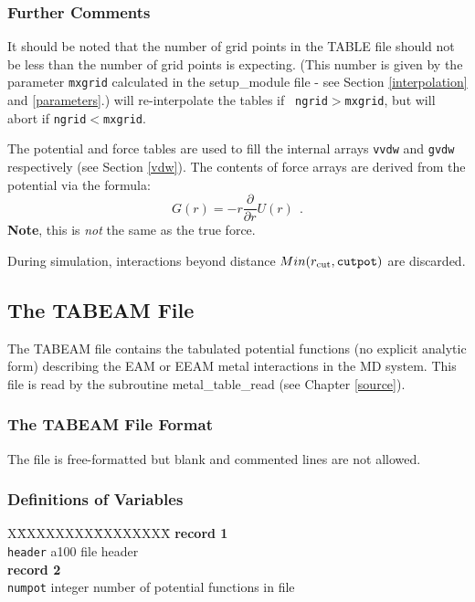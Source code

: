 \subsubsection{Further Comments}

It should be noted that the number of grid points in the TABLE file
should not be less than the number of grid points \D is expecting.
(This number is given by the parameter {\tt mxgrid} calculated in
the {\sc setup\_module} file - see Section \ref{interpolation} and
\ref{parameters}.)  \D will re-interpolate the tables if {\tt
ngrid}$>${\tt mxgrid}, but will abort if {\tt ngrid}$<${\tt mxgrid}.

The potential and force tables are used to fill the internal
arrays {\tt vvdw} and {\tt gvdw} respectively (see Section
\ref{vdw}).  The contents of force arrays are derived from the
potential via the formula:
\begin{equation}
G(r)=-r\frac{\partial}{\partial r}U(r)~~.
\end{equation}
{\bf Note}, this is {\em not} the same as the true force.

During simulation, interactions beyond distance
$Min(r_{\rm cut},{\tt cutpot})$ are discarded.

\subsection{The TABEAM File}
\label{tabeam-file}

The TABEAM file contains the tabulated potential functions (no explicit
analytic form) describing the EAM or EEAM
metal interactions in the MD system.  This file is read by the subroutine
{\sc metal\_table\_read} (see Chapter \ref{source}).

\subsubsection{The TABEAM File Format}

The file is free-formatted but blank and commented lines are not
allowed.

\subsubsection{Definitions of Variables}

\begin{tabbing}
X\=XXXXXXXX\=XXXXXXXX\=\kill
{\bf record 1} \\
\> {\tt header} \> a100    \> file header\\
{\bf record 2} \\
\> {\tt numpot} \> integer \> number of potential functions in file
\end{tabbing}

